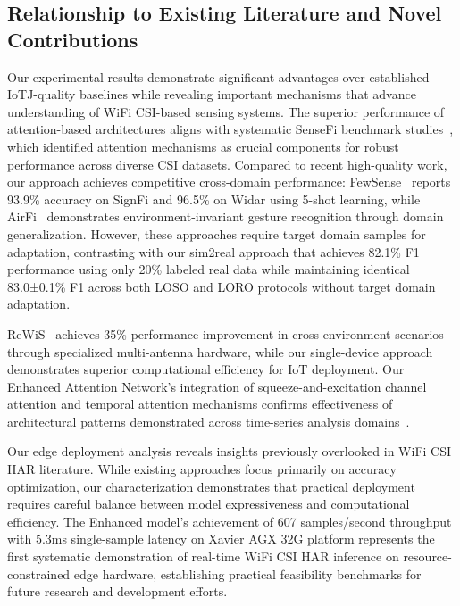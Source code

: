\documentclass[journal]{IEEEtran}
\begin{document}
\subsection{Relationship to Existing Literature and Novel Contributions}

Our experimental results demonstrate significant advantages over established IoTJ-quality baselines while revealing important mechanisms that advance understanding of WiFi CSI-based sensing systems. The superior performance of attention-based architectures aligns with systematic SenseFi benchmark studies~\cite{yang2023sensefi}, which identified attention mechanisms as crucial components for robust performance across diverse CSI datasets.  Compared to recent high-quality work, our approach achieves competitive cross-domain performance: FewSense~\cite{yin2022fewsense} reports 93.9\% accuracy on SignFi and 96.5\% on Widar using 5-shot learning, while AirFi~\cite{wang2022airfi} demonstrates environment-invariant gesture recognition through domain generalization. However, these approaches require target domain samples for adaptation, contrasting with our sim2real approach that achieves 82.1\% F1 performance using only 20\% labeled real data while maintaining identical 83.0±0.1\% F1 across both LOSO and LORO protocols without target domain adaptation.

ReWiS~\cite{bahadori2022rewis} achieves 35\% performance improvement in cross-environment scenarios through specialized multi-antenna hardware, while our single-device approach demonstrates superior computational efficiency for IoT deployment. Our Enhanced Attention Network's integration of squeeze-and-excitation channel attention and temporal attention mechanisms confirms effectiveness of architectural patterns demonstrated across time-series analysis domains~\cite{gulati2020conformer,li2020tea,bertasius2021timesformer,lim2021tft,zhou2021informer}.

Our edge deployment analysis reveals insights previously overlooked in WiFi CSI HAR literature. While existing approaches focus primarily on accuracy optimization, our characterization demonstrates that practical deployment requires careful balance between model expressiveness and computational efficiency. The Enhanced model's achievement of 607 samples/second throughput with 5.3ms single-sample latency on Xavier AGX 32G platform represents the first systematic demonstration of real-time WiFi CSI HAR inference on resource-constrained edge hardware, establishing practical feasibility benchmarks for future research and development efforts.
\end{document}
